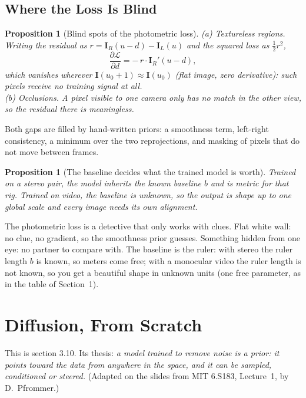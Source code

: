 \documentclass[11pt,a4paper]{article}
\theoremstyle{definition}
\theoremstyle{plain}
\newtheorem{proposition}[definition]{Proposition}
\theoremstyle{remark}
\begin{document}
\subsection{Where the Loss Is Blind }
\begin{proposition}[Blind spots of the photometric loss]
(a) \emph{Textureless regions.} Writing the residual as $r=\bm I_R(u-d)-\bm I_L(u)$ and the squared loss as $\tfrac12 r^2$,
\begin{equation}
\frac{\partial \mathcal L}{\partial d}=-\,r\cdot \bm I_R'(u-d),
\end{equation}
which vanishes wherever $\bm I(u_0+1)\approx \bm I(u_0)$ (flat image, zero derivative): such pixels receive \emph{no training signal at all}.\\
(b) \emph{Occlusions.} A pixel visible to one camera only has no match in the other view, so the residual there is meaningless.
\end{proposition}

Both gaps are filled by hand-written priors: a smoothness term, left-right consistency, a minimum over the two reprojections, and masking of pixels that do not move between frames.

\begin{proposition}[The baseline decides what the trained model is worth]
Trained on a stereo pair, the model inherits the known baseline $b$ and is metric \emph{for that rig}. Trained on video, the baseline is unknown, so the output is shape up to one global scale and every image needs its own alignment.
\end{proposition}

\begin{intuition}
The photometric loss is a detective that only works with clues. Flat white wall: no clue, no gradient, so the smoothness prior guesses. Something hidden from one eye: no partner to compare with. The baseline is the ruler: with stereo the ruler length $b$ is known, so meters come free; with a monocular video the ruler length is not known, so you get a beautiful shape in unknown units (one free parameter, as in the table of Section~1).
\end{intuition}

\section{Diffusion, From Scratch }
This is section 3.10. Its thesis: \emph{a model trained to remove noise is a prior: it points toward the data from anywhere in the space, and it can be sampled, conditioned or steered.} (Adapted on the slides from MIT 6.S183, Lecture~1, by D.~Pfrommer.)
\end{document}
